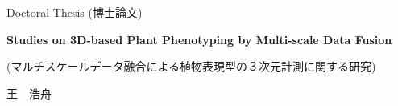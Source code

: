 \documentclass[doctor,12pt]{styles/iscs-thesis}
\begin{document}
\begin{titlepage}
  \begin{center}
      \vspace*{2.5cm}

      {\LARGE Doctoral Thesis (博士論文)}

      \vspace*{2cm}

      \begin{spacing}{4.5}
        \textbf{\Huge Studies on 3D-based Plant Phenotyping by Multi-scale Data Fusion}
      \end{spacing}

      \vspace{0.5cm}
      \textrm{(マルチスケールデータ融合による植物表現型の３次元計測に関する研究)}
           
      \vspace{7.5cm}

      \textrm{\Huge 王　浩舟}

      \vfill
          
  \end{center}
\end{titlepage}




\frontmatter %
\tableofcontents %
\listoffigures %
\listoftables %
\glsfindwidesttoplevelname
{}
\printnoidxglossary[type=acronym, title=List of Abbreviations, toctitle=List of Abbreviations]

\mainmatter %

\doublespacing








\begin{singlespace}
\end{singlespace}


\end{document}

